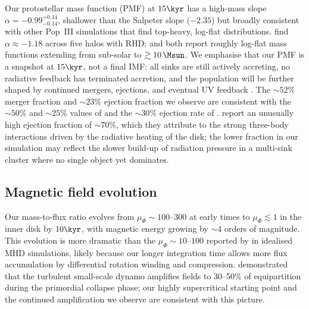 Our protostellar mass function (PMF) at $15\kyr$ has a high-mass
slope $\alpha = -0.99^{+0.14}_{-0.14}$, shallower than the Salpeter
slope ($-2.35$) but broadly consistent with other Pop~III simulations
that find top-heavy, log-flat distributions.
\citet{latif_khochfar22} find $\alpha \approx -1.18$ across five
halos with RHD; \citet{stacy16} and \citet{greif11} both report
roughly log-flat mass functions extending from sub-solar to
$\gtrsim 10\,\Msun$.
We emphasise that our PMF is a snapshot at $15\kyr$, not a final IMF:
all sinks are still actively accreting, no radiative feedback has
terminated accretion, and the population will be further shaped by
continued mergers, ejections, and eventual UV feedback
\citep{hosokawa11, hosokawa16, stacy16}.
The $\sim 52\%$ merger fraction and $\sim 23\%$ ejection fraction
we observe are consistent with the $\sim 50\%$ and $\sim 25\%$
values of \citet{stacy12} and the $\sim 30\%$ ejection rate of
\citet{wollenberg20}.
\citet{latif_khochfar22} report an unusually high ejection fraction
of $\sim 70\%$, which they attribute to the strong three-body
interactions driven by the radiative heating of the disk; the lower
fraction in our simulation may reflect the slower build-up of
radiation pressure in a multi-sink cluster where no single object
yet dominates.

\subsection*{Magnetic field evolution}

Our mass-to-flux ratio evolves from $\mu_\Phi \sim 100$--$300$ at
early times to $\mu_\Phi \lesssim 1$ in the inner disk by $10\kyr$,
with magnetic energy growing by $\sim 4$ orders of magnitude.
This evolution is more dramatic than the $\mu_\Phi \sim 10$--$100$
reported by \citet{machida08} in idealised MHD simulations, likely
because our longer integration time allows more flux accumulation by
differential rotation winding and compression.
\citet{higashi24} demonstrated that the turbulent small-scale dynamo
amplifies fields to 30--50\% of equipartition during the primordial
collapse phase; our highly supercritical starting point and the
continued amplification we observe are consistent with this picture.


